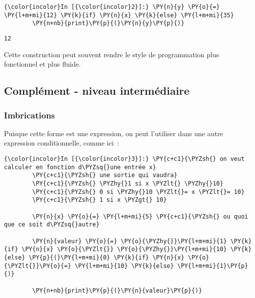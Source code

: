     \begin{Verbatim}[commandchars=\\\{\}]
{\color{incolor}In [{\color{incolor}2}]:} \PY{n}{y} \PY{o}{=} \PY{l+m+mi}{12} \PY{k}{if} \PY{n}{x} \PY{k}{else} \PY{l+m+mi}{35}
        \PY{n+nb}{print}\PY{p}{(}\PY{n}{y}\PY{p}{)}
\end{Verbatim}


    \begin{Verbatim}[commandchars=\\\{\}]
12

    \end{Verbatim}

    Cette construction peut souvent rendre le style de programmation plus
fonctionnel et plus fluide.

    \hypertarget{compluxe9ment---niveau-intermuxe9diaire}{%
\subsection{Complément - niveau
intermédiaire}\label{compluxe9ment---niveau-intermuxe9diaire}}

    \hypertarget{imbrications}{%
\subsubsection{Imbrications}\label{imbrications}}

    Puisque cette forme est une expression, on peut l'utiliser dans une
autre expression conditionnelle, comme ici~:

    \begin{Verbatim}[commandchars=\\\{\}]
{\color{incolor}In [{\color{incolor}3}]:} \PY{c+c1}{\PYZsh{} on veut calculer en fonction d\PYZsq{}une entrée x}
        \PY{c+c1}{\PYZsh{} une sortie qui vaudra}
        \PY{c+c1}{\PYZsh{} \PYZhy{}1 si x \PYZlt{} \PYZhy{}10}
        \PY{c+c1}{\PYZsh{} 0 si \PYZhy{}10 \PYZlt{}= x \PYZlt{}= 10}
        \PY{c+c1}{\PYZsh{} 1 si x \PYZgt{} 10}
        
        \PY{n}{x} \PY{o}{=} \PY{l+m+mi}{5} \PY{c+c1}{\PYZsh{} ou quoi que ce soit d\PYZsq{}autre}
        
        \PY{n}{valeur} \PY{o}{=} \PY{o}{\PYZhy{}}\PY{l+m+mi}{1} \PY{k}{if} \PY{n}{x} \PY{o}{\PYZlt{}} \PY{o}{\PYZhy{}}\PY{l+m+mi}{10} \PY{k}{else} \PY{p}{(}\PY{l+m+mi}{0} \PY{k}{if} \PY{n}{x} \PY{o}{\PYZlt{}}\PY{o}{=} \PY{l+m+mi}{10} \PY{k}{else} \PY{l+m+mi}{1}\PY{p}{)}
        
        \PY{n+nb}{print}\PY{p}{(}\PY{n}{valeur}\PY{p}{)}
\end{Verbatim}


